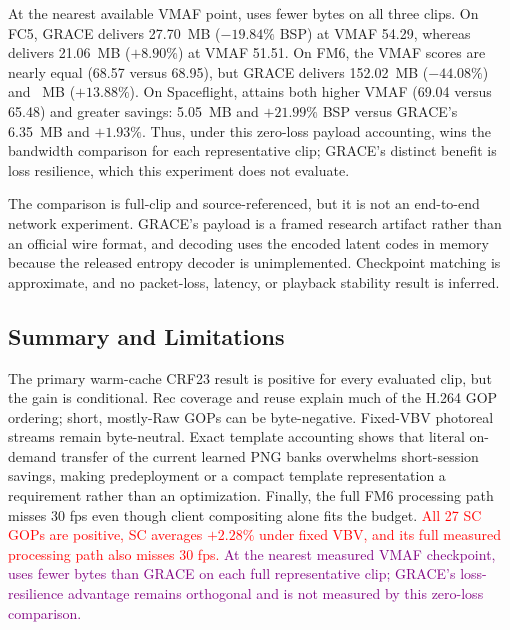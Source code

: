 \begin{table}[t]
  \centering
  \scriptsize
  \caption{Full-clip zero-loss comparison with GRACE at the nearest measured
  VMAF checkpoint. GRACE payload includes entropy-coded latent, BPG refresh,
  and framing bytes; its BSP uses the matched H.264 baseline as denominator.
  \sysname includes video and RMD. Templates are resident before use, so
  runtime template bytes are zero and Video+RMD equals All-in. Positive BSP is
  better.}
  \label{tab:grace-direct}
  
\end{table}

At the nearest available VMAF point, \sysname uses fewer bytes on all three
clips. On FC5, GRACE delivers 27.70~MB ($-19.84\%$ BSP) at VMAF 54.29,
whereas \sysname delivers 21.06~MB ($+8.90\%$) at VMAF 51.51. On FM6, the
VMAF scores are nearly equal (68.57 versus 68.95), but GRACE delivers
152.02~MB ($-44.08\%$) and ~MB ($+13.88\%$). On Spaceflight,
\sysname attains both higher VMAF (69.04 versus 65.48) and greater savings:
5.05~MB and $+21.99\%$ BSP versus GRACE's 6.35~MB and $+1.93\%$.
Thus, under this zero-loss payload accounting, \sysname wins the bandwidth
comparison for each representative clip; GRACE's distinct benefit is loss
resilience, which this experiment does not evaluate.

The comparison is full-clip and source-referenced, but it is not an
end-to-end network experiment. GRACE's payload is a framed research artifact
rather than an official wire format, and decoding uses the encoded latent
codes in memory because the released entropy decoder is unimplemented.
Checkpoint matching is approximate, and no packet-loss, latency, or playback
stability result is inferred.
\endgroup

\subsection{Summary and Limitations}
\label{sec:res-summary}

The primary warm-cache CRF23 result is positive for every evaluated clip, but
the gain is conditional. Rec coverage and reuse explain much of the H.264 GOP
ordering; short, mostly-Raw GOPs can be byte-negative. Fixed-VBV photoreal
streams remain byte-neutral. Exact template accounting shows that literal
on-demand transfer of the current learned PNG banks overwhelms short-session
savings, making predeployment or a compact template representation a
requirement rather than an optimization. Finally, the full FM6 processing path
misses 30 fps even though client compositing alone fits the budget.
\textcolor{red}{All 27 SC GOPs are positive, SC averages $+2.28\%$ under fixed
VBV, and its full measured processing path also misses 30 fps.}
\textcolor{purple}{At the nearest measured VMAF checkpoint, \sysname uses fewer
bytes than GRACE on each full representative clip; GRACE's loss-resilience
advantage remains orthogonal and is not measured by this zero-loss comparison.}

